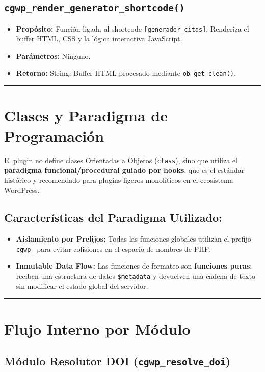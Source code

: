 \documentclass[11pt, a4paper]{article}
\begin{document}
\subsection{\texttt{cgwp\_render\_generator\_shortcode()}}
\begin{itemize}
\item \textbf{Propósito:} Función ligada al shortcode \texttt{[generador\_citas]}. Renderiza el buffer HTML, CSS y la lógica interactiva JavaScript.
\item \textbf{Parámetros:} Ninguno.
\item \textbf{Retorno:} String: Buffer HTML procesado mediante \texttt{ob\_get\_clean()}.
\end{itemize}

\bigskip\noindent\rule{\textwidth}{0.4pt}\bigskip


\section{Clases y Paradigma de Programación}

El plugin no define clases Orientadas a Objetos (\texttt{class}), sino que utiliza el \textbf{paradigma funcional/procedural guiado por hooks}, que es el estándar histórico y recomendado para plugins ligeros monolíticos en el ecosistema WordPress.


\subsection{Características del Paradigma Utilizado:}
\begin{itemize}
\item \textbf{Aislamiento por Prefijos:} Todas las funciones globales utilizan el prefijo \texttt{cgwp\_} para evitar colisiones en el espacio de nombres de PHP.
\item \textbf{Inmutable Data Flow:} Las funciones de formateo son \textbf{funciones puras}: reciben una estructura de datos \texttt{\$metadata} y devuelven una cadena de texto sin modificar el estado global del servidor.
\end{itemize}

\bigskip\noindent\rule{\textwidth}{0.4pt}\bigskip


\section{Flujo Interno por Módulo}

\subsection{Módulo Resolutor DOI (\texttt{cgwp\_resolve\_doi})}
\end{document}
